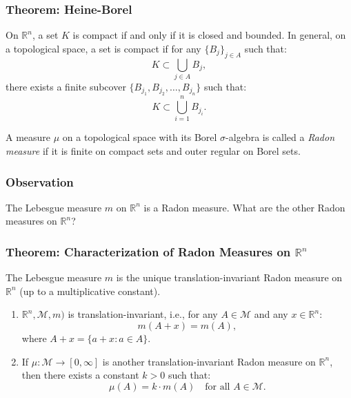 \documentclass[11pt]{article}
\begin{document}
\begin{center}
\end{center}

\subsubsection{Theorem: Heine-Borel}
On \(\mathbb{R}^n\), a set \(K\) is compact if and only if it is closed and bounded. In general, on a topological space, a set is compact if for any \(\{B_j\}_{j \in A}\) such that:
\[K \subset \bigcup_{j \in A} B_j,\]
there exists a finite subcover \(\{B_{j_1}, B_{j_2}, \ldots, B_{j_n}\}\) such that:
\[K \subset \bigcup_{i=1}^{n} B_{j_i}.\]

A measure \(\mu\) on a topological space with its Borel \(\sigma\)-algebra is called a \textit{Radon measure} if it is finite on compact sets and outer regular on Borel sets.

\subsubsection*{Observation}
The Lebesgue measure \(m\) on \(\mathbb{R}^n\) is a Radon measure. What are the other Radon measures on \(\mathbb{R}^n\)?

\subsubsection{Theorem: Characterization of Radon Measures on \(\mathbb{R}^n\)}
The Lebesgue measure \(m\) is the unique translation-invariant Radon measure on \(\mathbb{R}^n\) (up to a multiplicative constant).  
\begin{enumerate}
    \item \(\mathbb{R}^n, \mathcal{M}, m)\) is translation-invariant, i.e., for any \(A \in \mathcal{M}\) and any \(x \in \mathbb{R}^n\):
    \[m(A + x) = m(A),\]
    where \(A + x = \{a + x : a \in A\}\).
    \item If \(\mu : \mathcal{M} \to [0, \infty]\) is another translation-invariant Radon measure on \(\mathbb{R}^n\), then there exists a constant \(k > 0\) such that:
    \[\mu(A) = k \cdot m(A) \quad \text{for all } A \in \mathcal{M}.\]
\end{enumerate}
\end{document}
